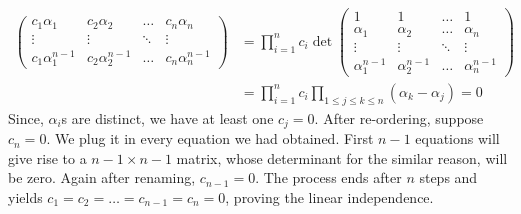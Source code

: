 \documentclass[11pt, a4paper, abstract=true]{scrartcl}
\begin{document}
\begin{soln}
\begin{align*}
\begin{pmatrix}
            c_1\alpha_1 & c_2\alpha_2 & \dots & c_n\alpha_n\\
            \vdots & \vdots & \ddots & \vdots\\
            c_1\alpha_1^{n-1} & c_2\alpha_2^{n-1} & \dots & c_n\alpha_{n}^{n-1}
        \end{pmatrix}
        &= 
        \prod_{i=1}^{n}c_i
        \det
        \begin{pmatrix}
            1 & 1 & \dots & 1\\
            \alpha_1 & \alpha_2 & \dots & \alpha_n\\
            \vdots & \vdots & \ddots & \vdots\\
            \alpha_1^{n-1} & \alpha_2^{n-1} & \dots & \alpha_{n}^{n-1}
        \end{pmatrix} \\
        &= 
        \prod_{i=1}^{n}c_i
        \prod_{1\leq j \leq k \leq n}(\alpha_k - \alpha_j) = 0
    \end{align*}
    Since, \(\alpha_i\)s are distinct, we have at least one \(c_j = 0\). After re-ordering, suppose \(c_n = 0\). We plug it in every equation we had obtained. First \(n-1\) equations will give rise to a \(n-1 \times n-1\) matrix, whose determinant for the similar reason, will be zero. Again after renaming, \(c_{n-1} = 0\). The process ends after \(n\) steps and yields \(c_1 = c_{2} = \dots = c_{n-1} = c_n = 0\), proving the linear independence.
\end{soln}
\end{document}
